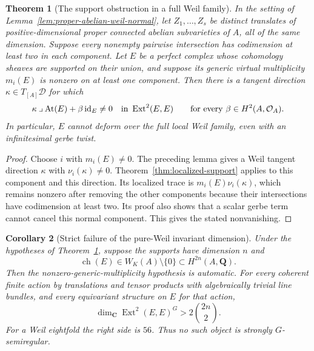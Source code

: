 \documentclass[11pt]{article}
\newtheorem{theorem}{Theorem}[section]
\newtheorem{corollary}[theorem]{Corollary}
\theoremstyle{definition}
\theoremstyle{remark}
\begin{document}
\begin{theorem}[The support obstruction in a full Weil family]
\label{thm:proper-abelian-support}
In the setting of Lemma~\ref{lem:proper-abelian-weil-normal}, let
$Z_1,\ldots,Z_s$ be distinct translates of positive-dimensional
proper connected abelian subvarieties of $A$, all of the same
dimension.  Suppose every nonempty pairwise intersection has
codimension at least two in each component.  Let $E$ be a perfect
complex whose cohomology sheaves are supported on their union,
and suppose its generic virtual multiplicity $m_i(E)$ is nonzero
on at least one component.  Then there is a tangent direction
$\kappa\in T_{[A]}\mathcal D$ for which
\[
 \kappa\mathbin{\lrcorner}\operatorname{At}(E)
       +\beta\operatorname{id}_E\ne0
       \quad\hbox{in }\operatorname{Ext}^2(E,E)
       \qquad\text{for every }\beta\in H^2(A,\mathcal O_A).
\]
In particular, $E$ cannot deform over the full local Weil family,
even with an infinitesimal gerbe twist.
\end{theorem}

\begin{proof}
Choose $i$ with $m_i(E)\ne0$.  The preceding lemma gives a Weil
tangent direction $\kappa$ with $\nu_i(\kappa)\ne0$.
Theorem~\ref{thm:localized-support} applies to this component and
this direction.  Its localized trace is
$m_i(E)\nu_i(\kappa)$, which remains nonzero after removing the
other components because their intersections have codimension at
least two.  Its proof also shows that a scalar gerbe term cannot
cancel this normal component.  This gives the stated nonvanishing.
\end{proof}

\begin{corollary}[Strict failure of the pure-Weil invariant dimension]
\label{cor:proper-abelian-pure-weil}
Under the hypotheses of Theorem~\ref{thm:proper-abelian-support},
suppose the supports have dimension $n$ and
\[
 \operatorname{ch}(E)\in W_K(A)\setminus\{0\}
       \subset H^{2n}(A,\mathbf Q).
\]
Then the nonzero-generic-multiplicity hypothesis is automatic.
For every coherent finite action by translations and tensor products
with algebraically trivial line bundles, and every equivariant
structure on $E$ for that action,
\[
 \dim_{\mathbf C}\operatorname{Ext}^2(E,E)^G
                  >2\binom{2n}{2}.
\]
For a Weil eightfold the right side is $56$.  Thus no such object
is strongly $G$-semiregular.
\end{corollary}
\end{document}
